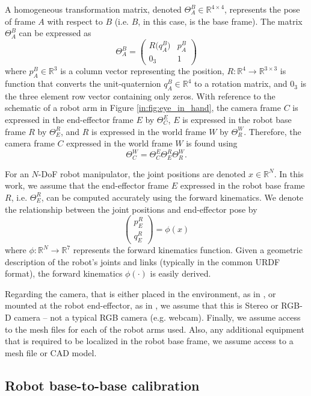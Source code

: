 A homogeneous transformation matrix, denoted $\Theta^B_A\in\mathbb{R}^{4 \times 4}$, represents the pose of frame $A$ with respect to $B$ (i.e. $B$, in this case, is the base frame).
The matrix $\Theta^B_A$ can be expressed as
\[
\Theta^B_A = 
    \left(
    \begin{array}{cc}
     R\big(q^B_A\big) & p^B_A \\
     0_3 & 1
    \end{array}
    \right)
\]
where $p^B_A\in\mathbb{R}^3$ is a column vector representing the position, $R:\mathbb{R}^4\rightarrow\mathbb{R}^{3\times 3}$ is function that converts the unit-quaternion $q^B_A\in\mathbb{R}^4$ to a rotation matrix, and $0_3$ is the three element row vector containing only zeros.
With reference to the schematic of a robot arm in Figure \ref{in:fig:eye_in_hand}, the camera frame $C$ is expressed in the end-effector frame $E$ by $\Theta^E_C$,
$E$ is expressed in the robot base frame $R$ by $\Theta^R_E$, and
$R$ is expressed in the world frame $W$ by $\Theta^W_R$.
Therefore, the camera frame $C$ expressed in the world frame $W$ is found using
\[
\Theta^W_C = \Theta^E_C \Theta^R_E \Theta^W_R.
\]

For an $N$-DoF robot manipulator, the joint positions are denoted $x\in\mathbb{R}^N$.
In this work, we assume that the end-effector frame $E$ expressed in the robot base frame $R$, i.e. $\Theta^R_E$, can be computed accurately using the forward kinematics. 
We denote the relationship between the joint positions and end-effector pose by
\[
\left(
\begin{array}{c}
     p^R_E\\
     q^R_E
\end{array}
\right)
= \phi(x)
\]
where $\phi: \mathbb{R}^N\rightarrow\mathbb{R}^{7}$ represents the forward kinematics function.
Given a geometric description of the robot's joints and links (typically in the common URDF format), the forward kinematics $\phi(\cdot)$ is easily derived.

Regarding the camera, that is either placed in the environment, as in , or mounted at the robot end-effector, as in , we assume that this is Stereo or RGB-D camera -- not a typical RGB camera (e.g. webcam).
Finally, we assume access to the mesh files for each of the robot arms used.
Also, any additional equipment that is required to be localized in the robot base frame, we assume access to a mesh file or CAD model.

\subsection{Robot base-to-base calibration}

